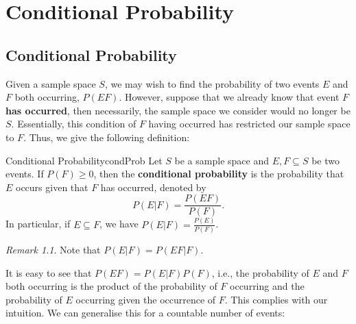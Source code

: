 \documentclass[math]{amznotes}
\theoremstyle{remark}
\newtheorem*{remark}{Remark}
\begin{document}
\chapter{Conditional Probability}
\section{Conditional Probability}
Given a sample space $S$, we may wish to find the probability of two events $E$ and $F$ both occurring, $P(EF)$. However, suppose that we already know that event $F$ \textbf{has occurred}, then necessarily, the sample space we consider would no longer be $S$. Essentially, this condition of $F$ having occurred has restricted our sample space to $F$. Thus, we give the following definition:
\begin{dfnbox}{Conditional Probability}{condProb}
    Let $S$ be a sample space and $E, F \subseteq S$ be two events. If $P(F) \geq 0$, then the {\color{red} \textbf{conditional probability}} is the probability that $E$ occurs given that $F$ has occurred, denoted by
    \begin{equation*}
        P(E|F) = \frac{P(EF)}{P(F)}.
    \end{equation*}
    In particular, if $E \subseteq F$, we have $P(E|F) = \frac{P(E)}{P(F)}$.
\end{dfnbox}
\begin{notebox}
    \begin{remark}
        Note that $P(E|F) = P(EF|F)$.
    \end{remark}
\end{notebox}
It is easy to see that $P(EF) = P(E|F)P(F)$, i.e., the probability of $E$ and $F$ both occurring is the product of the probability of $F$ occurring and the probability of $E$ occurring given the occurrence of $F$. This complies with our intuition. We can generalise this for a countable number of events:
\end{document}
